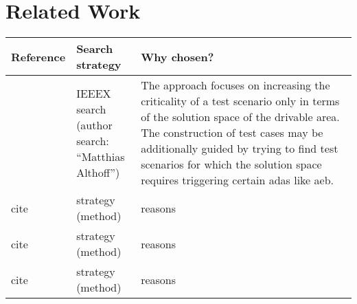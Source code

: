 \documentclass[oneside, notitlepage, twocolumn]{scrartcl}
\newcommand{\tableheadline}[1]{\textbf{#1}}
\begin{document}
\section{Related Work}
\begin{adjustbox}{angle=90}
\begin{tabularx}{\textwidth}{llX}
    \tableheadline{Reference} & \tableheadline{Search strategy} & \tableheadline{Why chosen?}\\
    \midrule
    \cite{evasiveManeuvers} & \makecell{IEEEX search\\(author search:\\``Matthias Althoff'')} & The approach focuses on increasing the criticality of a test scenario only in terms of the solution space of the drivable area.
    The construction of test cases may be additionally guided by trying to find test scenarios for which the solution space requires triggering certain \gls{adas} like \gls{aeb}.\\
    \midrule
    cite & \makecell{strategy\\(method)} & reasons\\
    \midrule
    cite & \makecell{strategy\\(method)}& reasons\\
    \midrule
    cite & \makecell{strategy\\(method)}& reasons\\
\end{tabularx}
\end{adjustbox}
\end{document}
